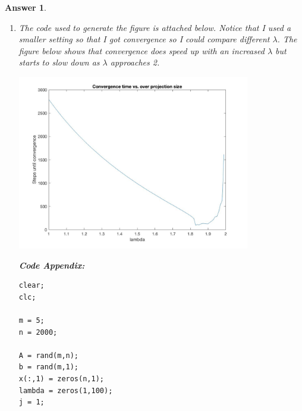 \documentclass[12pt]{article}
\theoremstyle{colon}
\newtheorem*{answer}{Answer}
\begin{document}
\begin{answer}
\begin{enumerate}[label=\alph*)]
			\textbf{Code Appendix:}

			\begin{lstlisting}[style=Matlab-editor, basicstyle=\scriptsize]
clear;
clc;

m = 500;
n = 2000;

A = rand(m,n);
b = rand(m,1);
x(:,1) = rand(n,1);
i = 1;

while (norm(A*x(:,i) - b,2) > 10^-5)
    i = i + 1;
    % project into affine set
    x(:,i) = x(:,i-1) + A'/(A*A')*(b-A*x(:,i-1));
    
    i = i + 1;
    % project into positive orthant
    x(:,i) = max(0, x(:,i-1));
    
    res(ceil(i/2)) = norm(A*x(:,i) - b,2);
end

plot(res)
			\end{lstlisting}

		\item The code used to generate the figure is attached below. Notice that I used a smaller setting so that I got convergence so I could compare different $\lambda$. The figure below shows that convergence does speed up with an increased $\lambda$ but starts to slow down as $\lambda$ approaches 2.

			\begin{center}
		        \includegraphics[width=0.8\textwidth]{2c.jpg}
			\end{center}

			\textbf{Code Appendix:}

			\begin{lstlisting}[style=Matlab-editor, basicstyle=\scriptsize]
clear;
clc;

m = 5;
n = 2000;

A = rand(m,n);
b = rand(m,1);
x(:,1) = zeros(n,1);
lambda = zeros(1,100);
j = 1;


\end{lstlisting}
\end{enumerate}
\end{answer}
\end{document}
